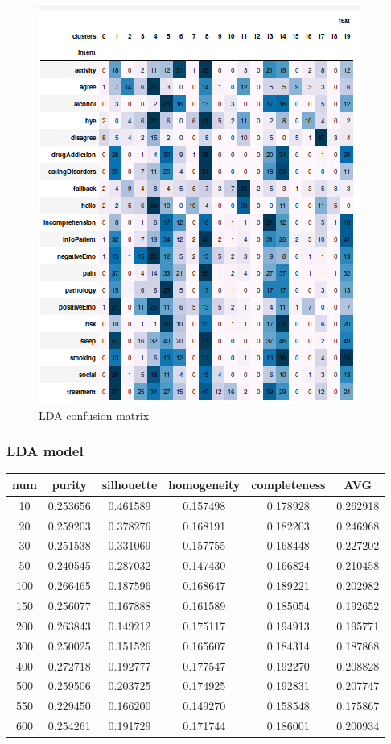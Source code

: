 \documentclass[11pt]{article}
\begin{document}
 \begin{figure}[h]
 	\centering
 	\includegraphics[scale=0.7]{best_w2v_cm.png}
	\caption{LDA confusion matrix}
 \label{words_freq}
 \end{figure}



\subsubsection{LDA model}


\begin{tabular}{ |c|c|c|c|c|c| }
\hline
num & purity  & silhouette  & homogeneity  & completeness  & AVG\\ \hline 
10  & 0.253656  & 0.461589  & 0.157498  & 0.178928  & 0.262918\\ \hline 
20  & 0.259203  & 0.378276  & 0.168191  & 0.182203  & 0.246968\\ \hline 
30  & 0.251538  & 0.331069  & 0.157755  & 0.168448  & 0.227202\\ \hline 
50  & 0.240545  & 0.287032  & 0.147430  & 0.166824  & 0.210458\\ \hline 
100  & 0.266465  & 0.187596  & 0.168647  & 0.189221  & 0.202982\\ \hline 
150  & 0.256077  & 0.167888  & 0.161589  & 0.185054  & 0.192652\\ \hline 
200  & 0.263843  & 0.149212  & 0.175117  & 0.194913  & 0.195771\\ \hline 
300  & 0.250025  & 0.151526  & 0.165607  & 0.184314  & 0.187868\\ \hline 
400  & 0.272718  & 0.192777  & 0.177547  & 0.192270  & 0.208828\\ \hline 
500  & 0.259506  & 0.203725  & 0.174925  & 0.192831  & 0.207747\\ \hline 
550  & 0.229450  & 0.166200  & 0.149270  & 0.158548  & 0.175867\\ \hline 
600  & 0.254261  & 0.191729  & 0.171744  & 0.186001  & 0.200934\\
\hline 
\end{tabular}
\end{document}
